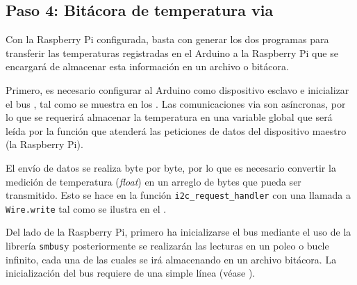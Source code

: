 %
%



\subsection{Paso 4: Bitácora de temperatura via \IIC}%
\label{sec:step4}

Con la Raspberry Pi configurada, basta con generar los dos programas para transferir las temperaturas registradas en el Arduino a la Raspberry Pi que se encargará de almacenar esta información en un archivo o bitácora.

Primero, es necesario configurar al Arduino como dispositivo esclavo e inicializar el bus \IIC, tal como se muestra en los .
Las comunicaciones via \IIC son asíncronas, por lo que se requerirá almacenar la temperatura en una variable global que será leída por la función que atenderá las peticiones de datos del dispositivo maestro (la Raspberry Pi).





El envío de datos se realiza byte por byte, por lo que es necesario convertir la medición de temperatura (\emph{float}) en un arreglo de bytes que pueda ser transmitido.
Esto se hace en la función \texttt{i2c\_request\_handler} con una llamada a \texttt{Wire.write} tal como se ilustra en el .



Del lado de la Raspberry Pi, primero ha inicializarse el bus \IIC mediante el uso de la librería \texttt{smbus}\footnotemark y posteriormente se realizarán las lecturas en un poleo o bucle infinito, cada una de las cuales se irá almacenando en un archivo bitácora.
La inicialización del bus requiere de una simple línea (véase ).

